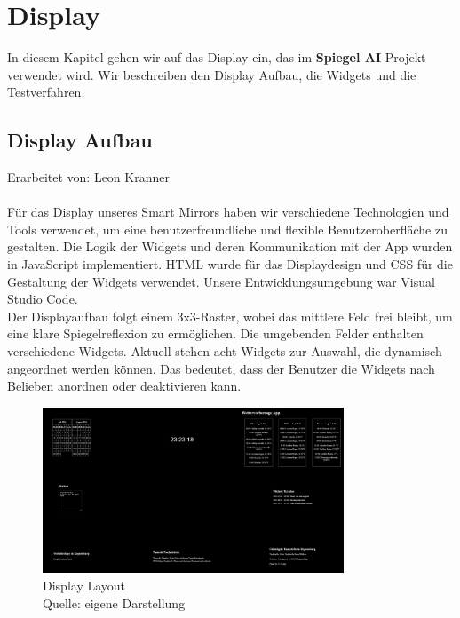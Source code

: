 \chapter{Display}

In diesem Kapitel gehen wir auf das Display ein, das im \textbf{Spiegel AI} Projekt verwendet wird. Wir beschreiben den Display Aufbau,  die Widgets und die Testverfahren.

\section{Display Aufbau}
Erarbeitet von: Leon Kranner \\ \\

\noindent
Für das Display unseres Smart Mirrors haben wir verschiedene Technologien und Tools verwendet, um eine benutzerfreundliche und flexible Benutzeroberfläche zu gestalten. Die Logik der Widgets und deren Kommunikation mit der App wurden in JavaScript implementiert. HTML wurde für das Displaydesign und CSS für die Gestaltung der Widgets verwendet. Unsere Entwicklungsumgebung war Visual Studio Code. \\

\noindent
Der Displayaufbau folgt einem 3x3-Raster, wobei das mittlere Feld frei bleibt, um eine klare Spiegelreflexion zu ermöglichen. Die umgebenden Felder enthalten verschiedene Widgets. Aktuell stehen acht Widgets zur Auswahl, die dynamisch angeordnet werden können. Das bedeutet, dass der Benutzer die Widgets nach Belieben anordnen oder deaktivieren kann. 

\begin{figure}[h]
    \centering
    \includegraphics[width=0.8\textwidth]{pictures/display.png}
  \captionsetup{justification=centering, labelformat=simple, singlelinecheck=false}
    \caption[Display Layout]{Display Layout\\ Quelle: eigene Darstellung}
\end{figure}

